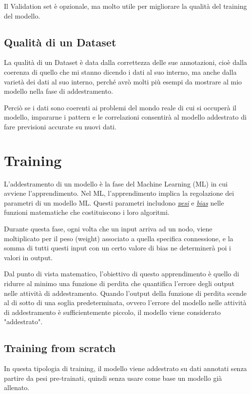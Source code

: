 Il Validation set è opzionale, ma molto utile per migliorare la qualità del training del modello.

\subsection{Qualità di un Dataset}
La qualità di un Dataset è data dalla correttezza delle sue annotazioni, cioè dalla coerenza di quello che mi stanno dicendo i dati al suo interno, ma anche dalla varietà dei dati al suo interno,
perché avrò molti più esempi da mostrare al mio modello nella fase di addestramento.

Perciò se i dati sono coerenti ai problemi del mondo reale di cui si occuperà il modello, impararne i pattern e le correlazioni consentirà al modello addestrato di fare previsioni accurate su nuovi dati.

\newpage

\section{Training}

L'addestramento di un modello è la fase del Machine Learning (ML) in cui avviene l'apprendimento. Nel ML, l'apprendimento implica la regolazione dei parametri di un modello ML.
Questi parametri includono \hyperlink{weights}{\textit{pesi}} e \hyperlink{b}{\textit{bias}} nelle funzioni matematiche che costituiscono i loro algoritmi.

Durante questa fase, ogni volta che un input arriva ad un nodo, viene moltiplicato per il peso (weight) associato a quella specifica connessione,
e la somma di tutti questi input con un certo valore di bias ne determinerà poi i valori in output.

Dal punto di vista matematico, l'obiettivo di questo apprendimento è quello di ridurre al minimo una funzione di perdita che quantifica l'errore degli output nelle attività di addestramento.
Quando l'output della funzione di perdita scende al di sotto di una soglia predeterminata, ovvero l'errore del modello nelle attività di addestramento è sufficientemente piccolo,
il modello viene considerato "addestrato". \cite{training_nn}

\subsection{Training from scratch}

In questa tipologia di training, il modello viene addestrato su dati annotati senza partire da pesi pre-trainati, quindi senza usare come base un modello già allenato.

